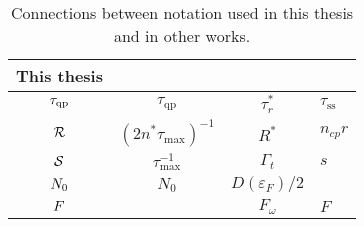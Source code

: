 \begin{table}[tbp]
\centering
\caption
{Connections between notation used in this thesis and in other works.}
\renewcommand{\arraystretch}{1.2}
\begin{tabular}{cccl}
\toprule
This thesis & \textcite{Zmuidzinas2012ARCMP} & \textcite{Wilson2004PRB} & \textcite{Wang2014NatComm} \\
\midrule
$\tau_{\mathrm{qp}}$ & $\tau_\mathrm{qp}$ & $\tau_r^*$ & $\tau_\mathrm{ss}$ \\
$\mathcal{R}$ & $(2 n^* \tau_\mathrm{max})^{-1}$ & $R^*$ & $n_{cp} r$ \\
$\mathcal{S}$ & $\tau_\mathrm{max}^{-1}$ & $\Gamma_t$ & $s$ \\
$N_0$ & $N_0$ & $D(\varepsilon_F) / 2$ &  \\
$F$ &  & $F_\omega$ & $F$ \\
\bottomrule
\end{tabular}
\label{tab:connections}
\end{table}
